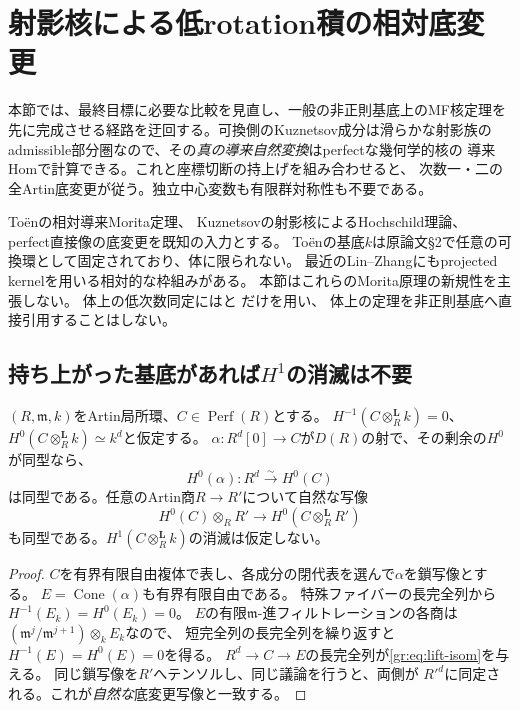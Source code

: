 \section{射影核による低rotation積の相対底変更}\label{gr:sec:basechange}

本節では、最終目標に必要な比較を見直し、一般の非正則基底上のMF核定理を
先に完成させる経路を迂回する。可換側のKuznetsov成分は滑らかな射影族の
admissible部分圏なので、その\emph{真の導来自然変換}はperfectな幾何学的核の
導来Homで計算できる。これと座標切断の持上げを組み合わせると、
次数一・二の全Artin底変更が従う。独立中心変数も有限群対称性も不要である。

To\"enの相対導来Morita定理\cite[Theorems~8.9, 8.15]{GRToen}、
Kuznetsovの射影核によるHochschild理論\cite{GRKuznetsov}、
perfect直接像の底変更\cite[Tag~0B91]{GRStacks}を既知の入力とする。
To\"enの基底$k$は原論文\S2で任意の可換環として固定されており、体に限られない。
最近のLin--Zhang\cite[\S2.1]{GRLZ26}にもprojected kernelを用いる相対的な枠組みがある。
本節はこれらのMorita原理の新規性を主張しない。
体上の低次数同定には\cite[Theorem~5.39]{GRBFK}と
\cite[Theorem~3.5, Remark~3.6, \S5]{GRLZ}だけを用い、
体上の定理を非正則基底へ直接引用することはしない。

\subsection{持ち上がった基底があれば$H^1$の消滅は不要}

\begin{lemma}\label{gr:lem:lifts}
$(R,\mathfrak m,k)$をArtin局所環、$C\in\operatorname{Perf}(R)$とする。
$H^{-1}(C\otimes_R^{\mathbf L}k)=0$、
$H^0(C\otimes_R^{\mathbf L}k)\simeq k^d$と仮定する。
$\alpha:R^d[0]\to C$が$D(R)$の射で、その剰余の$H^0$が同型なら、
\[
 H^0(\alpha):R^d\xrightarrow{\sim}H^0(C)
 \tag{GR1}\label{gr:eq:lift-isom}
\]
は同型である。任意のArtin商$R\to R'$について自然な写像
\[
 H^0(C)\otimes_R R'\longrightarrow
 H^0(C\otimes_R^{\mathbf L}R')
\]
も同型である。$H^1(C\otimes_R^{\mathbf L}k)$の消滅は仮定しない。
\end{lemma}
\begin{proof}
$C$を有界有限自由複体で表し、各成分の閉代表を選んで$\alpha$を鎖写像とする。
$E=\operatorname{Cone}(\alpha)$も有界有限自由である。
特殊ファイバーの長完全列から$H^{-1}(E_k)=H^0(E_k)=0$。
$E$の有限$\mathfrak m$-進フィルトレーションの各商は
$(\mathfrak m^j/\mathfrak m^{j+1})\otimes_k E_k$なので、
短完全列の長完全列を繰り返すと$H^{-1}(E)=H^0(E)=0$を得る。
$R^d\to C\to E$の長完全列が\eqref{gr:eq:lift-isom}を与える。
同じ鎖写像を$R'$へテンソルし、同じ議論を行うと、両側が
$R'^d$に同定される。これが\emph{自然な}底変更写像と一致する。
\end{proof}

